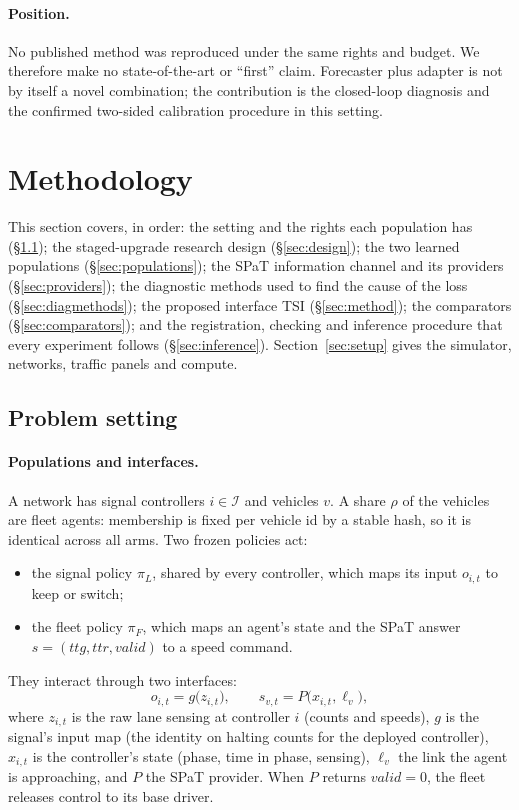 \documentclass[11pt]{article}
\begin{document}
\paragraph{Position.} No published method was reproduced under the same rights and budget. We therefore make no state-of-the-art or
``first'' claim. Forecaster plus adapter is not by itself a novel combination; the contribution is the closed-loop diagnosis and the
confirmed two-sided calibration procedure in this setting.

\section{Methodology}\label{sec:methodology}
This section covers, in order: the setting and the rights each population has (§\ref{sec:setting}); the staged-upgrade research
design (§\ref{sec:design}); the two learned populations (§\ref{sec:populations}); the SPaT information channel and its providers
(§\ref{sec:providers}); the diagnostic methods used to find the cause of the loss (§\ref{sec:diagmethods}); the proposed interface TSI
(§\ref{sec:method}); the comparators (§\ref{sec:comparators}); and the registration, checking and inference procedure that every
experiment follows (§\ref{sec:inference}). Section~\ref{sec:setup} gives the simulator, networks, traffic panels and compute.

\subsection{Problem setting}\label{sec:setting}
\paragraph{Populations and interfaces.} A network has signal controllers $i\in\mathcal I$ and vehicles $v$. A share $\rho$ of the vehicles
are fleet agents: membership is fixed per vehicle id by a stable hash, so it is identical across all arms. Two frozen policies act:
\begin{itemize}\setlength\itemsep{0pt}
\item the signal policy $\pi_L$, shared by every controller, which maps its input $o_{i,t}$ to keep or switch;
\item the fleet policy $\pi_F$, which maps an agent's state and the SPaT answer $s=(\mathit{ttg},\mathit{ttr},\mathit{valid})$ to a speed
command.
\end{itemize}
They interact through two interfaces:
\begin{equation}
o_{i,t} = g\big(z_{i,t}\big), \qquad s_{v,t} = P\big(x_{i,t}, \ell_v\big),
\end{equation}
where $z_{i,t}$ is the raw lane sensing at controller $i$ (counts and speeds), $g$ is the signal's input map (the identity on halting
counts for the deployed controller), $x_{i,t}$ is the controller's state (phase, time in phase, sensing), $\ell_v$ the link the agent is
approaching, and $P$ the SPaT provider. When $P$ returns $\mathit{valid}=0$, the fleet releases control to its base driver.
\end{document}
